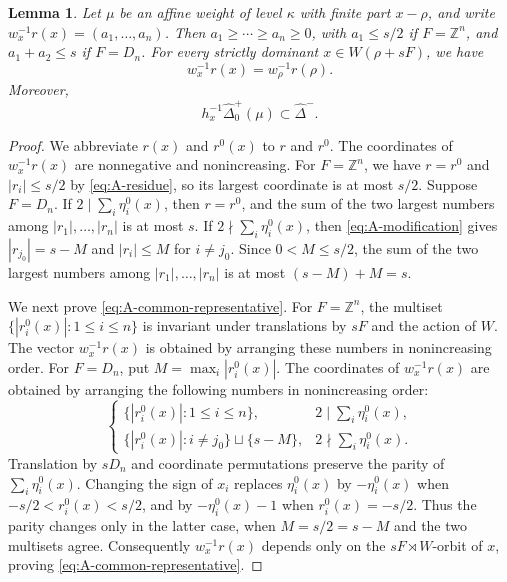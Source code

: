 \documentclass[11pt,a4paper]{amsart}
\newcommand{\ZZ}{\mathbb Z}
\theoremstyle{plain}
\newtheorem{lem}[theorem]{Lemma}
\numberwithin{equation}{section}
\newenvironment{pf}{\begin{proof}}{\end{proof}}
\begin{document}
\begin{lem}\label{lem:A-root-signs}
Let \(\mu\) be an affine weight of level \(\kappa\) with finite
part \(x-\rho\), and write \(w_x^{-1}r(x)=(a_1,\ldots,a_n)\).
Then \(a_1\ge\cdots\ge a_n\ge0\), with \(a_1\le s/2\) if
\(F=\ZZ^n\), and \(a_1+a_2\le s\) if \(F=D_n\).
For every strictly dominant \(x\in W(\rho+sF)\), we have
\begin{equation}\label{eq:A-common-representative}
w_x^{-1}r(x)=w_\rho^{-1}r(\rho).
\end{equation}
Moreover,
\[
h_x^{-1}\widehat\Delta_0^+(\mu)\subset\widehat\Delta^-.
\]
\end{lem}
\begin{pf}
We abbreviate \(r(x)\) and \(r^0(x)\) to \(r\) and \(r^0\).
The coordinates of \(w_x^{-1}r(x)\) are nonnegative and
nonincreasing.
For \(F=\ZZ^n\), we have \(r=r^0\) and
\(|r_i|\le s/2\) by \eqref{eq:A-residue}, so
its largest coordinate is at most \(s/2\).
Suppose \(F=D_n\). If \(2\mid\sum_i\eta_i^0(x)\), then
\(r=r^0\), and the sum of the two largest numbers among
\(|r_1|,\ldots,|r_n|\) is at most \(s\).
If \(2\nmid\sum_i\eta_i^0(x)\), then
\eqref{eq:A-modification} gives
\(|r_{j_0}|=s-M\) and \(|r_i|\le M\) for \(i\ne j_0\).
Since \(0<M\le s/2\), the sum of the two largest numbers among
\(|r_1|,\ldots,|r_n|\) is at most \((s-M)+M=s\).

We next prove \eqref{eq:A-common-representative}. For \(F=\ZZ^n\),
the multiset \(\{|r_i^0(x)|:1\le i\le n\}\) is invariant under
translations by \(sF\) and the action of \(W\).
The vector \(w_x^{-1}r(x)\) is obtained by arranging these numbers
in nonincreasing order. For \(F=D_n\), put \(M=\max_i|r_i^0(x)|\).
The coordinates of \(w_x^{-1}r(x)\) are obtained by arranging the
following numbers in nonincreasing order:
\[
\begin{cases}
\{|r_i^0(x)|:1\le i\le n\},
&\displaystyle2\mid\sum_i\eta_i^0(x),\\[1mm]
\{|r_i^0(x)|:i\ne j_0\}\sqcup\{s-M\},
&\displaystyle2\nmid\sum_i\eta_i^0(x).
\end{cases}
\]
Translation by \(sD_n\) and coordinate permutations preserve the
parity of \(\sum_i\eta_i^0(x)\). Changing the sign of \(x_i\)
replaces \(\eta_i^0(x)\) by \(-\eta_i^0(x)\) when
\(-s/2<r_i^0(x)<s/2\), and by \(-\eta_i^0(x)-1\) when
\(r_i^0(x)=-s/2\). Thus the parity changes only in the latter
case, when \(M=s/2=s-M\) and the two multisets agree.
Consequently \(w_x^{-1}r(x)\) depends only on the
\(sF\rtimes W\)-orbit of \(x\), proving \eqref{eq:A-common-representative}.


\end{pf}
\end{document}
